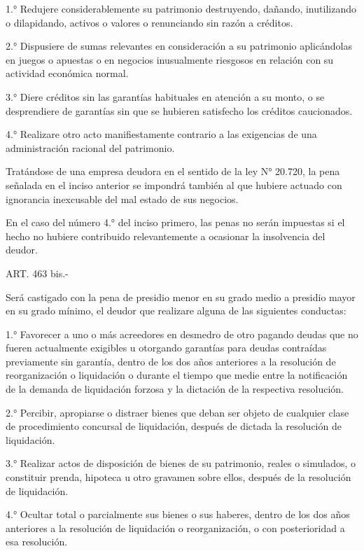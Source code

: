     1.° Redujere considerablemente su patrimonio destruyendo, dañando, inutilizando o dilapidando, activos o valores o renunciando sin razón a créditos.

    2.° Dispusiere de sumas relevantes en consideración a su patrimonio aplicándolas en juegos o apuestas o en negocios inusualmente riesgosos en relación con su actividad económica normal.

    3.° Diere créditos sin las garantías habituales en atención a su monto, o se desprendiere de garantías sin que se hubieren satisfecho los créditos caucionados.

    4.° Realizare otro acto manifiestamente contrario a las exigencias de una administración racional del patrimonio.

    Tratándose de una empresa deudora en el sentido de la ley N° 20.720, la pena señalada en el inciso anterior se impondrá también al que hubiere actuado con ignorancia inexcusable del mal estado de sus negocios.

    En el caso del número 4.° del inciso primero, las penas no serán impuestas si el hecho no hubiere contribuido relevantemente a ocasionar la insolvencia del deudor.




    ART. 463 bis.-

    Será castigado con la pena de presidio menor en su grado medio a presidio mayor en su grado mínimo, el deudor que realizare alguna de las siguientes conductas:

    1.° Favorecer a uno o más acreedores en desmedro de otro pagando deudas que no fueren actualmente exigibles u otorgando garantías para deudas contraídas previamente sin garantía, dentro de los dos años anteriores a la resolución de reorganización o liquidación o durante el tiempo que medie entre la notificación de la demanda de liquidación forzosa y la dictación de la respectiva resolución.

    2.° Percibir, apropiarse o distraer bienes que deban ser objeto de cualquier clase de procedimiento concursal de liquidación, después de dictada la resolución de liquidación.

    3.° Realizar actos de disposición de bienes de su patrimonio, reales o simulados, o constituir prenda, hipoteca u otro gravamen sobre ellos, después de la resolución de liquidación.

    4.° Ocultar total o parcialmente sus bienes o sus haberes, dentro de los dos años anteriores a la resolución de liquidación o reorganización, o con posterioridad a esa resolución.

